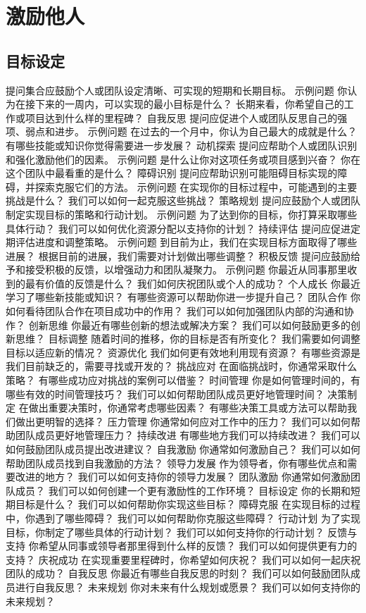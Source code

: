 \documentclass[12pt]{book}
\begin{document}
\section{激励他人}
\subsection{目标设定}
提问集合应鼓励个人或团队设定清晰、可实现的短期和长期目标。
示例问题
你认为在接下来的一周内，可以实现的最小目标是什么？
长期来看，你希望自己的工作或项目达到什么样的里程碑？
自我反思
提问应促进个人或团队反思自己的强项、弱点和进步。
示例问题
在过去的一个月中，你认为自己最大的成就是什么？
有哪些技能或知识你觉得需要进一步发展？
动机探索
提问应帮助个人或团队识别和强化激励他们的因素。
示例问题
是什么让你对这项任务或项目感到兴奋？
你在这个团队中最看重的是什么？
障碍识别
提问应帮助识别可能阻碍目标实现的障碍，并探索克服它们的方法。
示例问题
在实现你的目标过程中，可能遇到的主要挑战是什么？
我们可以如何一起克服这些挑战？
策略规划
提问应鼓励个人或团队制定实现目标的策略和行动计划。
示例问题
为了达到你的目标，你打算采取哪些具体行动？
我们可以如何优化资源分配以支持你的计划？
持续评估
提问应促进定期评估进度和调整策略。
示例问题
到目前为止，我们在实现目标方面取得了哪些进展？
根据目前的进展，我们需要对计划做出哪些调整？
积极反馈
提问应鼓励给予和接受积极的反馈，以增强动力和团队凝聚力。
示例问题
你最近从同事那里收到的最有价值的反馈是什么？
我们如何庆祝团队或个人的成功？
个人成长
你最近学习了哪些新技能或知识？
有哪些资源可以帮助你进一步提升自己？
团队合作
你如何看待团队合作在项目成功中的作用？
我们可以如何加强团队内部的沟通和协作？
创新思维
你最近有哪些创新的想法或解决方案？
我们可以如何鼓励更多的创新思维？
目标调整
随着时间的推移，你的目标是否有所变化？
我们需要如何调整目标以适应新的情况？
资源优化
我们如何更有效地利用现有资源？
有哪些资源是我们目前缺乏的，需要寻找或开发的？
挑战应对
在面临挑战时，你通常采取什么策略？
有哪些成功应对挑战的案例可以借鉴？
时间管理
你是如何管理时间的，有哪些有效的时间管理技巧？
我们可以如何帮助团队成员更好地管理时间？
决策制定
在做出重要决策时，你通常考虑哪些因素？
有哪些决策工具或方法可以帮助我们做出更明智的选择？
压力管理
你通常如何应对工作中的压力？
我们可以如何帮助团队成员更好地管理压力？
持续改进
有哪些地方我们可以持续改进？
我们可以如何鼓励团队成员提出改进建议？
自我激励
你通常如何激励自己？
我们可以如何帮助团队成员找到自我激励的方法？
领导力发展
作为领导者，你有哪些优点和需要改进的地方？
我们可以如何支持你的领导力发展？
团队激励
你通常如何激励团队成员？
我们可以如何创建一个更有激励性的工作环境？
目标设定
你的长期和短期目标是什么？
我们可以如何帮助你实现这些目标？
障碍克服
在实现目标的过程中，你遇到了哪些障碍？
我们可以如何帮助你克服这些障碍？
行动计划
为了实现目标，你制定了哪些具体的行动计划？
我们可以如何支持你的行动计划？
反馈与支持
你希望从同事或领导者那里得到什么样的反馈？
我们可以如何提供更有力的支持？
庆祝成功
在实现重要里程碑时，你希望如何庆祝？
我们可以如何一起庆祝团队的成功？
自我反思
你最近有哪些自我反思的时刻？
我们可以如何鼓励团队成员进行自我反思？
未来规划
你对未来有什么规划或愿景？
我们可以如何支持你的未来规划？
\end{document}
